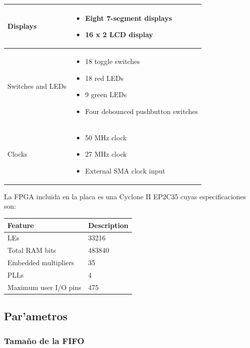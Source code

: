 \documentclass[12pt,spanish]{article}
\begin{document}
\begin{center}
\begin{longtable}{|l|p{4.75in}|}
		Displays & \begin{itemize}
					\item Eight 7-segment displays
    					\item 16 x 2 LCD display
    			 \end{itemize} \\ \hline
		Switches and LEDs & \begin{itemize}
					\item 18 toggle switches
    					\item 18 red LEDs
   					\item 9 green LEDs
   					\item Four debounced pushbutton switches
   				     \end{itemize} \\ \hline
		Clocks & \begin{itemize}
					\item 50 MHz clock
    					\item 27 MHz clock
   					\item External SMA clock input
   			 \end{itemize}	 \\ \hline
	\end{longtable} 
\end{center}

La FPGA incluida en la placa es una Cyclone II EP2C35 cuyas especificaciones son:

\begin{center}
	\begin{longtable}{|l|p{1.75in}|} \hline
		\textbf{Feature} & \textbf{Description} \\ \hline
		LEs & 33216 \\ \hline
		Total RAM bits & 483840 \\ \hline
		Embedded multipliers & 35 \\ \hline
		PLLs & 4 \\ \hline
		Maximum user I/O pins & 475 \\ \hline
	\end{longtable}
\end{center}
		
\subsection{Par'ametros}
\subsubsection{Tama\~no de la FIFO}
\end{document}
